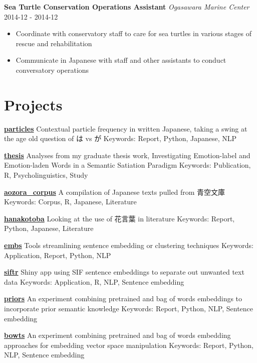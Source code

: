 \documentclass[a4paper,9pt]{extarticle}
\begin{document}
\noindent
\textbf{Sea Turtle Conservation Operations Assistant}
\noindent
\textit{Ogasawara Marine Center} \hfill 2014-12 - 2014-12
\begin{itemize}
\item Coordinate with conservatory staff to care for sea turtles in various stages of rescue and rehabilitation
\item Communicate in Japanese with staff and other assistants to conduct conversatory operations
\end{itemize}

\section*{Projects}

\noindent
\textbf{\href{https://github.com/ryancahildebrandt/particles}{particles}}
Contextual particle frequency in written Japanese, taking a swing at the age old question of は vs が
Keywords: Report, Python, Japanese, NLP

\noindent
\textbf{\href{https://github.com/ryancahildebrandt/thesis}{thesis}}
Analyses from my graduate thesis work, Investigating Emotion-label and Emotion-laden Words in a Semantic Satiation Paradigm
Keywords: Publication, R, Psycholinguistics, Study

\noindent
\textbf{\href{https://github.com/ryancahildebrandt/aozora_corpus}{aozora{\_}corpus}}
A compilation of Japanese texts pulled from 青空文庫
Keywords: Corpus, R, Japanese, Literature

\noindent
\textbf{\href{https://github.com/ryancahildebrandt/hanakotoba}{hanakotoba}}
Looking at the use of 花言葉 in literature 
Keywords: Report, Python, Japanese, Literature

\noindent
\textbf{\href{https://github.com/ryancahildebrandt/embs}{embs}}
Tools streamlining sentence embedding or clustering techniques
Keywords: Application, Report, Python, NLP

\noindent
\textbf{\href{https://github.com/ryancahildebrandt/siftr}{siftr}}
Shiny app using SIF sentence embeddings to separate out unwanted text data
Keywords: Application, R, NLP, Sentence embedding

\noindent
\textbf{\href{https://github.com/ryancahildebrandt/priors}{priors}}
An experiment combining pretrained and bag of words embeddings to incorporate prior semantic knowledge
Keywords: Report, Python, NLP, Sentence embedding

\noindent
\textbf{\href{https://github.com/ryancahildebrandt/bowts}{bowts}}
An experiment combining pretrained and bag of words embedding approaches for embedding vector space manipulation
Keywords: Report, Python, NLP, Sentence embedding
\end{document}
